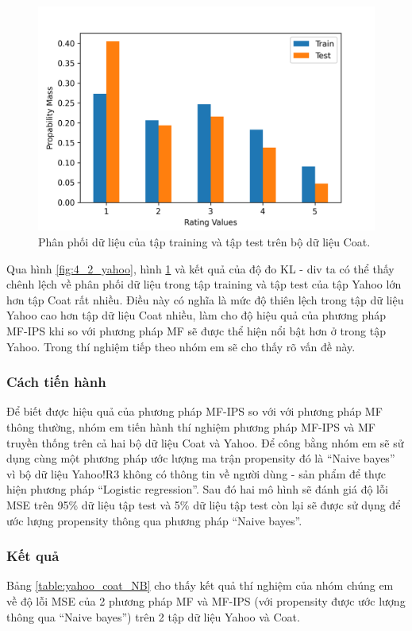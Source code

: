 \begin{figure}[h]
    \centering
    \includegraphics[width=\textwidth]{images/Chapter4/Diff_coat.png}
    \caption{Phân phối dữ liệu của tập training và tập test trên bộ dữ liệu Coat.}
    \label{fig:4_1_coat}
\end{figure}
Qua hình \ref{fig:4_2_yahoo}, hình \ref{fig:4_1_coat} và kết quả của độ đo KL - div ta có thể thấy chênh lệch về phân phối dữ liệu trong tập training và tập test của tập Yahoo lớn hơn tập Coat rất nhiều. Điều này có nghĩa là mức độ thiên lệch trong tập dữ liệu Yahoo cao hơn tập dữ liệu Coat nhiều, làm cho độ hiệu quả của phương pháp MF-IPS khi so với phương pháp MF sẽ được thể hiện nổi bật hơn ở trong tập Yahoo. Trong thí nghiệm tiếp theo nhóm em sẽ cho thấy rõ vấn đề này.
\subsubsection{Cách tiến hành}
Để biết được hiệu quả của phương pháp MF-IPS so với với phương pháp MF thông thường, nhóm em tiến hành thí nghiệm phương pháp MF-IPS và MF truyền thống trên cả hai bộ dữ liệu Coat và Yahoo. Để công bằng nhóm em sẽ sử dụng cùng một phương pháp ước lượng ma trận propensity đó là ``Naive bayes'' vì bộ dữ liệu Yahoo!R3 không có thông tin về người dùng - sản phẩm để thực hiện phương pháp ``Logistic regression''. Sau đó hai mô hình sẽ đánh giá độ lỗi MSE trên 95\% dữ liệu tập test và 5\% dữ liệu tập test còn lại sẽ được sử dụng để ước lượng propensity thông qua phương pháp ``Naive bayes''.
\subsubsection{Kết quả}
Bảng \ref{table:yahoo_coat_NB} cho thấy kết quả thí nghiệm của nhóm chúng em về độ lỗi MSE của 2 phương pháp MF và MF-IPS (với propensity được ước lượng thông qua ``Naive bayes'') trên 2 tập dữ liệu Yahoo và Coat.

